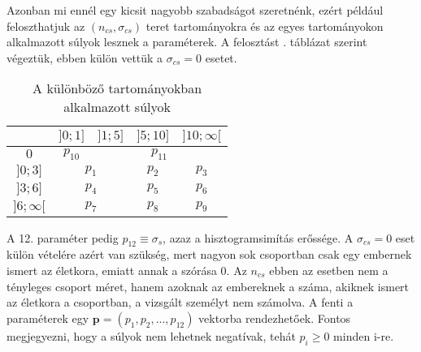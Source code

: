 \documentclass[12pt]{article}
\begin{document}
Azonban mi ennél egy kicsit nagyobb szabadságot szeretnénk, ezért például feloszthatjuk az $(n_{cs}, \sigma_{cs})$ teret tartományokra és az egyes tartományokon alkalmazott súlyok lesznek a paraméterek. A felosztást . táblázat szerint végeztük, ebben külön vettük a $\sigma_{cs} = 0$ esetet.
\begin{table}[H]
	\centering
	\begin{tabular}{|c|c|c|c|c|}
		\hline
		\diagbox{$\sigma_{cs}$}{$n_{cs}$} & $]0;1]$ & $]1;5]$ & $]5;10]$ & $]10;\infty[$  \\
		\hline
		$0$ & $p_{10}$ & \multicolumn{3}{|c|}{$p_{11}$} \\
		\hline
		$]0;3]$ & \multicolumn{2}{|c|}{$p_1$} & $p_2$ & $p_3$ \\
		\hline
		$]3;6]$ & \multicolumn{2}{|c|}{$p_4$} & $p_5$ & $p_6$ \\
		\hline
		$]6;\infty[$  & \multicolumn{2}{|c|}{$p_7$} & $p_8$ & $p_9$ \\
		\hline
	\end{tabular}
	\caption{A különböző tartományokban alkalmazott súlyok}
	\label{felosztas}
\end{table}
\noindent
A 12. paraméter pedig $p_{12} \equiv \sigma_s$, azaz a hisztogramsimítás erőssége. A $\sigma_{cs} = 0$ eset külön vételére azért van szükség, mert nagyon sok csoportban csak egy embernek ismert az életkora, emiatt annak a szórása $0$. Az $n_{cs}$ ebben az esetben nem a tényleges csoport méret, hanem azoknak az embereknek a száma, akiknek ismert az életkora a csoportban, a vizsgált személyt nem számolva.
A fenti a paraméterek egy $\mathbf{p} = (p_1, p_2, ..., p_{12})$ vektorba rendezhetőek. Fontos megjegyezni, hogy a súlyok nem lehetnek negatívak, tehát $p_i \ge 0$ minden i-re.
\end{document}
